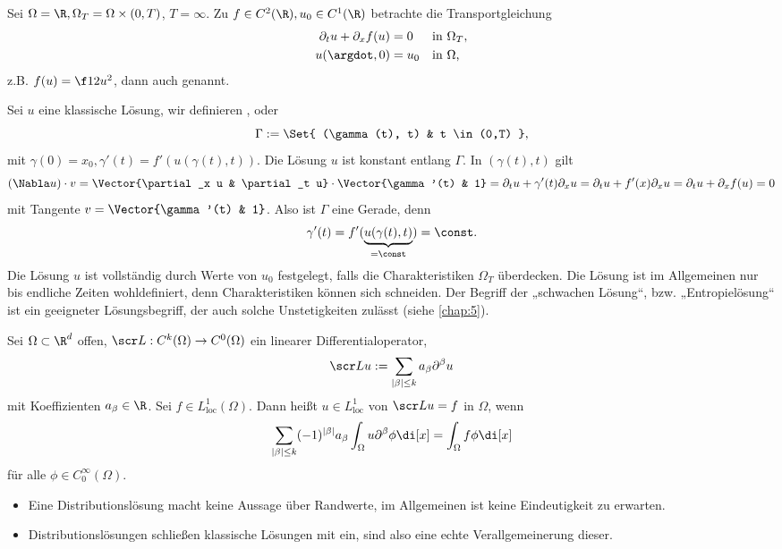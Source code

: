 \begin{ex} \label{1.26}
	Sei $\Omega = \R, \Omega_T = \Omega \times (0,T)$, $T = \infty$.
	Zu $f \in C^2(\R), u_0 \in C^1(\R)$ betrachte die Transportgleichung
	\begin{align*}
		\partial_t u + \partial_x f(u) &= 0 && \text{in $\Omega_T$}, \\
		u(\argdot, 0) &= u_0 && \text{in $\Omega$,}
	\end{align*}
	z.B. $f(u) = \f 12 u^2$, dann auch  genannt.

	Sei $u$ eine klassische Lösung, wir definieren , oder 
	\[
		\Gamma := \Set{ (\gamma(t), t) & t \in (0,T) },
	\]
	mit $\gamma(0) = x_0, \gamma'(t) = f'(u(\gamma(t), t))$.
	Die Lösung $u$ ist konstant entlang $\Gamma$.
	In $(\gamma(t),t)$ gilt
	\[
		(\Nabla u) \cdot v = \Vector{\partial_x u & \partial_t u} \cdot \Vector{\gamma'(t) & 1}
		= \partial_t u + \gamma'(t)  \partial_x u
		= \partial_t u + f'(x) \partial_x u
		= \partial_t u + \partial_x f(u)
		= 0
	\]
	mit Tangente $v = \Vector{\gamma'(t) & 1}$.
	Also ist $\Gamma$ eine Gerade, denn
	\[
		\gamma'(t) = f'(\underbrace{u(\gamma(t), t)}_{=\const}) = \const.
	\]
	Die Lösung $u$ ist vollständig durch Werte von $u_0$ festgelegt, falls die Charakteristiken $\Omega_T$ überdecken.
	Die Lösung ist im Allgemeinen nur bis endliche Zeiten wohldefiniert, denn Charakteristiken können sich schneiden.
	Der Begriff der „schwachen Lösung“, bzw. „Entropielösung“ ist ein geeigneter Lösungsbegriff, der auch solche Unstetigkeiten zulässt (siehe \ref{chap:5}).
\end{ex}

\begin{df}[Distributionslösung] \label{1.27}
	Sei $\Omega \subset \R^d$ offen, $\scr L: C^k(\Omega) \to C^0(\Omega)$ ein linearer Differentialoperator,
	\[
		\scr L u := \sum_{|\beta| \le k} a_\beta \partial^\beta u
	\]
	mit Koeffizienten $a_\beta \in \R$.
	Sei $f \in L^1_{\text{loc}}(\Omega)$.
	Dann heißt $u\in L^1_{\text{loc}}$  von $\scr L u = f$ in $\Omega$, wenn
	\begin{equation} \label{eq:1.4}
		\sum_{|\beta|\le k} (-1)^{|\beta|} a_\beta \int_\Omega u \partial^\beta \phi \di[x]
		 = \int_\Omega f \phi \di[x]
	\end{equation}
	für alle $\phi \in C_0^\infty(\Omega)$.
	\begin{note}
		\begin{itemize}
			\item
				Eine Distributionslösung macht keine Aussage über Randwerte, im Allgemeinen ist keine Eindeutigkeit zu erwarten.
			\item
				Distributionslösungen schließen klassische Lösungen mit ein, sind also eine echte Verallgemeinerung dieser.
		\end{itemize}
	\end{note}
\end{df}

